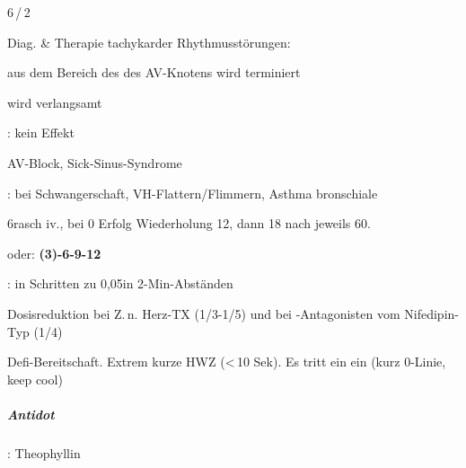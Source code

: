 {
\begin{MedikamentCharakteristika}
  \item[{\TxItemSpezialitaeten}] 6\Mg\,/\,2\Ml
  \item[{\TxItemIndikation}] Diag. \& Therapie tachykarder 
  Rhythmusstörungen:

   aus dem Bereich des des AV-Knotens wird
  terminiert

   wird verlangsamt

  : kein Effekt
  \item[{\TxItemKontraindikation}]  
  AV-Block, Sick-Sinus-Syndrome

  : bei Schwangerschaft, VH-Flattern/Flimmern, Asthma 
  bronschiale
  \item[{\TxItemDosierung}] 6\Mg* rasch iv., bei 0 Erfolg 
  Wiederholung 12\Mg, dann 18\Mg
  nach jeweils 60\Sek*.

  oder: \textbf{(3)-6-9-12} 
  
  : \MgKg* in Schritten zu
  0,05\MgKg* in 2-Min-Abständen
  
  Dosisreduktion bei Z.\,n. Herz-TX (1/3-1/5) und bei 
  -Antagonisten vom
  Nifedipin-Typ (1/4)

  Defi-Bereitschaft. Extrem kurze HWZ ({\textless}\,10 Sek). Es tritt
  ein  ein (kurz 0-Linie, keep cool)
\end{MedikamentCharakteristika}

\subparagraph{Antidot}: Theophyllin}
{}






